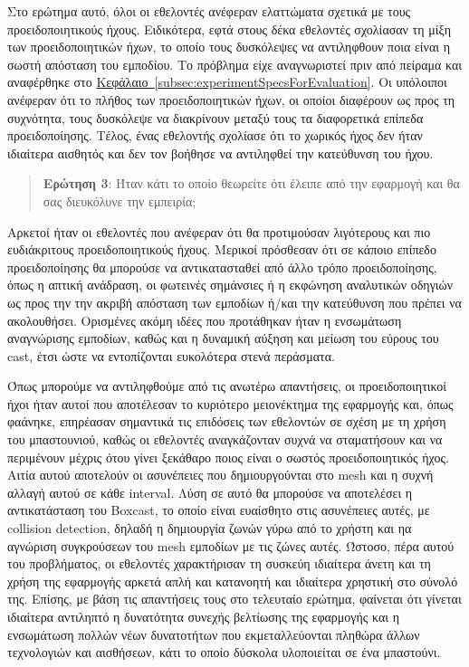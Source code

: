 Στο ερώτημα αυτό, όλοι οι εθελοντές ανέφεραν ελαττώματα σχετικά με τους προειδοποιητικούς ήχους. Ειδικότερα, εφτά στους δέκα εθελοντές σχολίασαν τη μίξη των προειδοποιητικών ήχων, το οποίο τους δυσκόλεψες να αντιληφθουν ποια είναι η σωστή απόσταση του εμποδίου. Το πρόβλημα είχε αναγνωριστεί πριν από πείραμα και αναφέρθηκε στο \hyperref[subsec:experimentSpecsForEvaluation]{Κεφάλαιο~\ref*{subsec:experimentSpecsForEvaluation}}. Οι υπόλοιποι ανέφεραν ότι το πλήθος των προειδοποιητικών ήχων, οι οποίοι διαφέρουν ως προς τη συχνότητα, τους δυσκόλεψε να διακρίνουν μεταξύ τους τα διαφορετικά επίπεδα προειδοποίησης. Τέλος, ένας εθελοντής σχολίασε ότι το χωρικός ήχος δεν ήταν ιδιαίτερα αισθητός και δεν τον βοήθησε να αντιληφθεί την κατεύθυνση του ήχου.
\\[\baselineskip]
\begin{quote}
    \textbf{Ερώτηση 3}: Ήταν κάτι το οποίο θεωρείτε ότι έλειπε από την εφαρμογή και θα σας διευκόλυνε την εμπειρία;
\end{quote}

Αρκετοί ήταν οι εθελοντές που ανέφεραν ότι θα προτιμούσαν λιγότερους και πιο ευδιάκριτους προειδοποιητικούς ήχους. Μερικοί πρόσθεσαν ότι σε κάποιο επίπεδο προειδοποίησης θα μπορούσε να αντικατασταθεί από άλλο τρόπο προειδοποίησης, όπως η απτική ανάδραση, οι φωτεινές σημάνσιες ή η εκφώνηση αναλυτικών οδηγιών ως προς την την ακριβή απόσταση των εμποδίων ή/και την κατεύθυνση που πρέπει να ακολουθήσει. Ορισμένες ακόμη ιδέες που προτάθηκαν ήταν η ενσωμάτωση αναγνώρισης εμποδίων, καθώς και η δυναμική αύξηση και μείωση του εύρους του cast, έτσι ώστε να εντοπίζονται ευκολότερα στενά περάσματα.

Όπως μπορούμε να αντιληφθούμε από τις ανωτέρω απαντήσεις, οι προειδοποιητικοί ήχοι ήταν αυτοί που αποτέλεσαν το κυριότερο μειονέκτημα της εφαρμογής και, όπως φαάνηκε, επηρέασαν σημαντικά τις επιδόσεις των εθελοντών σε σχέση με τη χρήση του μπαστουνιού, καθώς οι εθελοντές αναγκάζονταν συχνά να σταματήσουν και να περιμένουν μέχρις ότου γίνει ξεκάθαρο ποιος είναι ο σωστός προειδοποιητικός ήχος. Αιτία αυτού αποτελούν οι ασυνέπειες που δημιουργούνται στο mesh και η συχνή αλλαγή αυτού σε κάθε interval. Λύση σε αυτό θα μπορούσε να αποτελέσει η αντικατάσταση του Boxcast, το οποίο είναι ευαίσθητο στις ασυνέπειες αυτές, με collision detection, δηλαδή η δημιουργία ζωνών γύρω από το χρήστη και ηα αγνώριση συγκρούσεων του mesh εμποδίων με τις ζώνες αυτές. Ώστοσο, πέρα αυτού του προβλήματος, οι εθελοντές χαρακτήρισαν τη συσκεύη ιδιαίτερα άνετη και τη χρήση της εφαρμογής αρκετά απλή και κατανοητή και ιδιαίτερα χρηστική στο σύνολό της. Επίσης, με βάση τις απαντήσεις τους στο τελευταίο ερώτημα, φαίνεται ότι γίνεται ιδιαίτερα αντιληπτό η δυνατότητα συνεχής βελτίωσης της εφαρμογής και η ενσωμάτωση πολλών νέων δυνατοτήτων που εκμεταλλεύονται πληθώρα άλλων τεχνολογιών και αισθήσεων, κάτι το οποίο δύσκολα υλοποιείται σε ένα μπαστούνι.